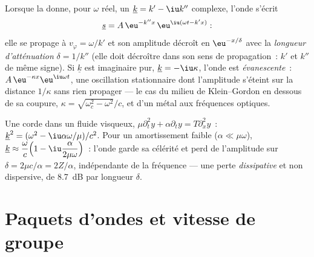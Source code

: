 \begin{definition}\label{def:b2:dispersion-wave-packets:complex}
Lorsque la  donne, pour $\omega$ réel, un $\underline k = k' - \iu k''$
complexe, l'onde s'écrit
\[
\underline s = A\,\eu^{-k''x}\,\eu^{\iu(\omega t - k'x)} :
\]
elle se propage à $v_\varphi = \omega/k'$ et son amplitude décroît en
$\eu^{-x/\delta}$ avec la \emph{longueur d'atténuation} $\delta = 1/k''$ (elle doit
décroître dans son sens de propagation~: $k'$ et $k''$ de même signe).
Si $\underline k$ est imaginaire pur, $\underline k = -\iu\kappa$, l'onde est
\emph{évanescente}~: $A\,\eu^{-\kappa x}\eu^{\iu\omega t}$, une oscillation stationnaire
dont l'amplitude s'éteint sur la distance $1/\kappa$ sans rien
propager --- le cas du milieu de Klein--Gordon en dessous de sa coupure,
$\kappa = \sqrt{\omega_c^2 - \omega^2}/c$, et d'un métal aux fréquences optiques.
\end{definition}

\begin{example}\label{ex:b2:dispersion-wave-packets:damped}
Une corde dans un fluide visqueux, $\mu\partial_t^2y + \alpha\partial_ty = T\partial_x^2y$~:
$\underline k^2 = (\omega^2 - \iu\alpha\omega/\mu)/c^2$. Pour un amortissement faible ($\alpha \ll \mu
\omega$), $\underline k \approx \dfrac\omega c\Bigl(1 - \iu\dfrac{\alpha}{2\mu\omega}\Bigr)$~: l'onde
garde sa célérité et perd de l'amplitude sur $\delta = 2\mu c/\alpha = 2Z/\alpha$,
indépendante de la fréquence --- une perte \emph{dissipative} et non dispersive,
de \qty{8.7}{dB} par longueur $\delta$.
\end{example}

\section{Paquets d'ondes et vitesse de groupe}

